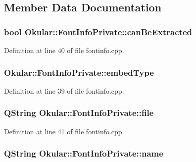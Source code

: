 \subsection{Member Data Documentation}
\hypertarget{classOkular_1_1FontInfoPrivate_a609a0c070f2e3df0bf7a52e813fbfa97}{
\subsubsection[{can\+Be\+Extracted}]{\setlength{\rightskip}{0pt plus 5cm}bool Okular\+::\+Font\+Info\+Private\+::can\+Be\+Extracted}}\label{classOkular_1_1FontInfoPrivate_a609a0c070f2e3df0bf7a52e813fbfa97}


Definition at line 40 of file fontinfo.\+cpp.

\hypertarget{classOkular_1_1FontInfoPrivate_a0721f81e98ea14cf6e69385e69443076}{
\subsubsection[{embed\+Type}]{ Okular\+::\+Font\+Info\+Private\+::embed\+Type}}\label{classOkular_1_1FontInfoPrivate_a0721f81e98ea14cf6e69385e69443076}


Definition at line 39 of file fontinfo.\+cpp.

\hypertarget{classOkular_1_1FontInfoPrivate_ab1e5c93ca5abb18a0c6684547897f2b1}{
\subsubsection[{file}]{\setlength{\rightskip}{0pt plus 5cm}Q\+String Okular\+::\+Font\+Info\+Private\+::file}}\label{classOkular_1_1FontInfoPrivate_ab1e5c93ca5abb18a0c6684547897f2b1}


Definition at line 41 of file fontinfo.\+cpp.

\hypertarget{classOkular_1_1FontInfoPrivate_af602b6da5bbdb6c17071c03b07742ea6}{
\subsubsection[{name}]{\setlength{\rightskip}{0pt plus 5cm}Q\+String Okular\+::\+Font\+Info\+Private\+::name}}\label{classOkular_1_1FontInfoPrivate_af602b6da5bbdb6c17071c03b07742ea6}


